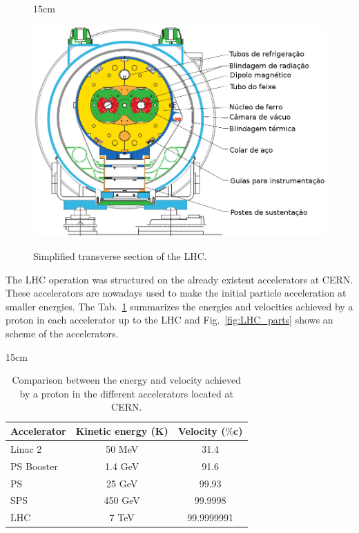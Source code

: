 \begin{figure}[htbp]{15cm}
\caption{Simplified transverse section of the LHC.}
\includegraphics[scale=0.4]{ChapterCMS/figs/lhc_csp.png}
\label{fig:lhc_cs}
\end{figure}

The LHC operation was structured on the already existent accelerators at CERN. These accelerators are nowadays used to make the initial particle acceleration at smaller energies. The Tab.~\ref{fig:acel_compare} summarizes the energies and velocities achieved by a proton in each accelerator up to the LHC and Fig.~\ref{fig:LHC_parts} shows an scheme of the accelerators.

\begin{table}[htbp]{15cm}
\caption{Comparison between the energy and velocity achieved by a proton in the different accelerators located at CERN.}
\begin{tabular}{p{3cm}cc}
\hline \hline
Accelerator  & Kinetic energy (K)   & Velocity ($\%$c)	    \\
\hline
Linac 2		 & 50 MeV				& 31.4					\\
PS Booster	 & 1.4 GeV				& 91.6					\\
PS			 & 25 GeV				& 99.93 				\\
SPS			 & 450 GeV				& 99.9998				\\
LHC			 & 7 TeV				& 99.9999991			\\
\hline \hline
\end{tabular}
\label{fig:acel_compare}
\end{table}

